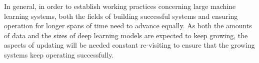  
 In general, in order to establish working practices concerning large machine learning systems, both the fields of building successful systems and ensuring operation for longer spans of time need to advance equally. As both the amounts of data and the sizes of deep learning models are expected to keep growing, the aspects of updating will be needed constant re-visiting to ensure that the growing systems keep operating successfully.
